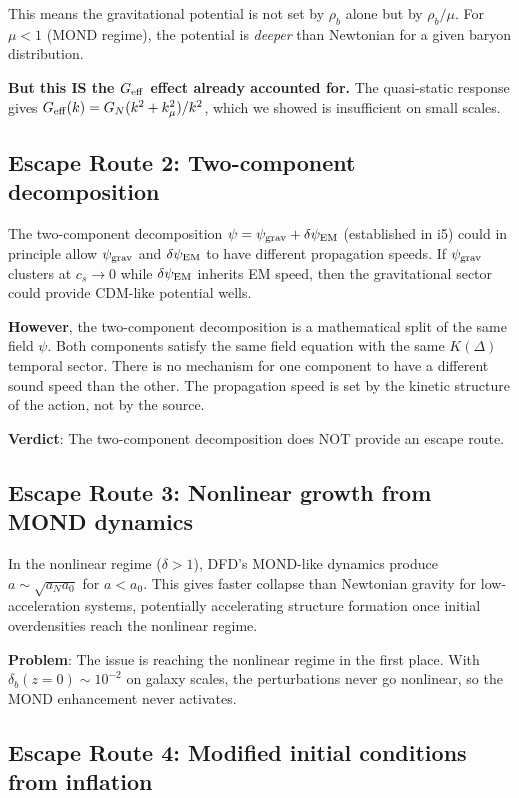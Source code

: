 \documentclass[11pt]{article}
\newcommand{\Geff}{G_{\rm eff}}
\newcommand{\kmu}{k_\mu}
\begin{document}
This means the gravitational potential is not set by $\rho_b$ alone but
by $\rho_b / \mu$. For $\mu < 1$ (MOND regime), the potential is
\emph{deeper} than Newtonian for a given baryon distribution.

\textbf{But this IS the $\Geff$ effect already accounted for.} The
quasi-static response gives $\Geff(k) = G_N(k^2 + \kmu^2)/k^2$,
which we showed is insufficient on small scales.

\subsection{Escape Route 2: Two-component decomposition}

The two-component decomposition $\psi = \psi_{\rm grav} + \delta\psi_{\rm EM}$
(established in i5) could in principle allow $\psi_{\rm grav}$ and
$\delta\psi_{\rm EM}$ to have different propagation speeds. If
$\psi_{\rm grav}$ clusters at $c_s \to 0$ while $\delta\psi_{\rm EM}$
inherits EM speed, then the gravitational sector could provide CDM-like
potential wells.

\textbf{However}, the two-component decomposition is a mathematical
split of the same field $\psi$. Both components satisfy the same
field equation with the same $K(\Delta)$ temporal sector. There is
no mechanism for one component to have a different sound speed than
the other. The propagation speed is set by the kinetic structure of
the action, not by the source.

\textbf{Verdict}: The two-component decomposition does NOT provide
an escape route.

\subsection{Escape Route 3: Nonlinear growth from MOND dynamics}

In the nonlinear regime ($\delta > 1$), DFD's MOND-like dynamics
produce $a \sim \sqrt{a_N a_0}$ for $a < a_0$. This gives faster
collapse than Newtonian gravity for low-acceleration systems, potentially
accelerating structure formation once initial overdensities reach
the nonlinear regime.

\textbf{Problem}: The issue is reaching the nonlinear regime in the
first place. With $\delta_b(z=0) \sim 10^{-2}$ on galaxy scales,
the perturbations never go nonlinear, so the MOND enhancement
never activates.

\subsection{Escape Route 4: Modified initial conditions from inflation}
\end{document}
